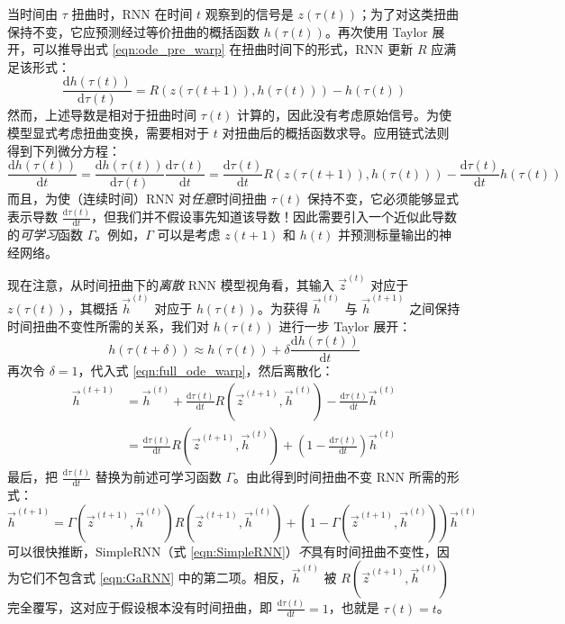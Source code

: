 当时间由 $\tau$ 扭曲时，RNN 在时间 $t$ 观察到的信号是 $z(\tau(t))$；为了对这类扭曲保持不变，它应预测经过等价扭曲的概括函数 $h(\tau(t))$。再次使用 Taylor 展开，可以推导出式 \ref{eqn:ode_pre_warp} 在扭曲时间下的形式，RNN 更新 $R$ 应满足该形式：
\begin{equation}\label{eqn:ode_post_warp}
    \frac{\mathrm{d}h(\tau(t))}{\mathrm{d}\tau(t)} = R(z(\tau(t+1)), h(\tau(t))) - h(\tau(t))
\end{equation}
然而，上述导数是相对于扭曲时间 $\tau(t)$ 计算的，因此没有考虑原始信号。为使模型显式考虑扭曲变换，需要相对于 $t$ 对扭曲后的概括函数求导。应用链式法则得到下列微分方程：
\begin{equation}\label{eqn:full_ode_warp}
    \frac{\mathrm{d}h(\tau(t))}{\mathrm{d}t} = \frac{\mathrm{d}h(\tau(t))}{\mathrm{d}\tau(t)}\frac{\mathrm{d}\tau(t)}{\mathrm{d}t} = \frac{\mathrm{d}\tau(t)}{\mathrm{d}t}R(z(\tau(t+1)), h(\tau(t))) - \frac{\mathrm{d}\tau(t)}{\mathrm{d}t}h(\tau(t))
\end{equation}
而且，为使（连续时间）RNN 对\emph{任意}时间扭曲 $\tau(t)$ 保持不变，它必须能够显式表示导数 $\frac{\mathrm{d}\tau(t)}{\mathrm{d}t}$，但我们并不假设事先知道该导数！因此需要引入一个近似此导数的\emph{可学习}函数 $\Gamma$。例如，$\Gamma$ 可以是考虑 $z(t+1)$ 和 $h(t)$ 并预测标量输出的神经网络。

现在注意，从时间扭曲下的\emph{离散} RNN 模型视角看，其输入 $\vec{z}^{(t)}$ 对应于 $z(\tau(t))$，其概括 $\vec{h}^{(t)}$ 对应于 $h(\tau(t))$。为获得 $\vec{h}^{(t)}$ 与 $\vec{h}^{(t+1)}$ 之间保持时间扭曲不变性所需的关系，我们对 $h(\tau(t))$ 进行一步 Taylor 展开：
\begin{equation*}
    h(\tau(t + \delta)) \approx h(\tau(t)) + \delta\frac{\mathrm{d}h(\tau(t))}{\mathrm{d}t}
\end{equation*}
再次令 $\delta=1$，代入式 \ref{eqn:full_ode_warp}，然后离散化：
\begin{align*}
    \vec{h}^{(t+1)} &= \vec{h}^{(t)} + \frac{\mathrm{d}\tau(t)}{\mathrm{d}t}R(\vec{z}^{(t+1)}, \vec{h}^{(t)}) - \frac{\mathrm{d}\tau(t)}{\mathrm{d}t}\vec{h}^{(t)}\\
    &= \frac{\mathrm{d}\tau(t)}{\mathrm{d}t}R(\vec{z}^{(t+1)}, \vec{h}^{(t)}) + \left(1 - \frac{\mathrm{d}\tau(t)}{\mathrm{d}t}\right)\vec{h}^{(t)}
\end{align*}
最后，把 $\frac{\mathrm{d}\tau(t)}{\mathrm{d}t}$ 替换为前述可学习函数 $\Gamma$。由此得到时间扭曲不变 RNN 所需的形式：
\begin{equation}\label{eqn:GaRNN}
    \vec{h}^{(t+1)} = \Gamma(\vec{z}^{(t+1)}, \vec{h}^{(t)})R(\vec{z}^{(t+1)}, \vec{h}^{(t)}) + (1 - \Gamma(\vec{z}^{(t+1)}, \vec{h}^{(t)}))\vec{h}^{(t)}
\end{equation}
可以很快推断，SimpleRNN（式 \ref{eqn:SimpleRNN}）\emph{不}具有时间扭曲不变性，因为它们不包含式 \ref{eqn:GaRNN} 中的第二项。相反，$\vec{h}^{(t)}$ 被 $R(\vec{z}^{(t+1)}, \vec{h}^{(t)})$ 完全覆写，这对应于假设根本没有时间扭曲，即 $\frac{\mathrm{d}\tau(t)}{\mathrm{d}t} = 1$，也就是 $\tau(t) = t$。

